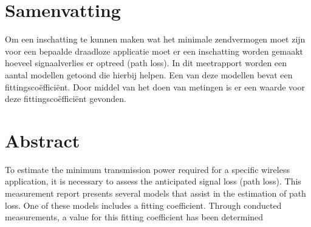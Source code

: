 \section{Samenvatting}
Om een inschatting te kunnen maken wat het minimale zendvermogen moet zijn voor een bepaalde draadloze applicatie moet er een inschatting worden gemaakt hoeveel signaalverlies er optreed (path loss). In dit meetrapport worden een aantal modellen getoond die hierbij helpen. Een van deze modellen bevat een fittingscoëfficiënt. Door middel van het doen van metingen is er een waarde voor deze fittingscoëfficiënt gevonden.
\section{Abstract}
To estimate the minimum transmission power required for a specific wireless application, it is necessary to assess the anticipated signal loss (path loss). This measurement report presents several models that assist in the estimation of path loss. One of these models includes a fitting coefficient. Through conducted measurements, a value for this fitting coefficient has been determined
